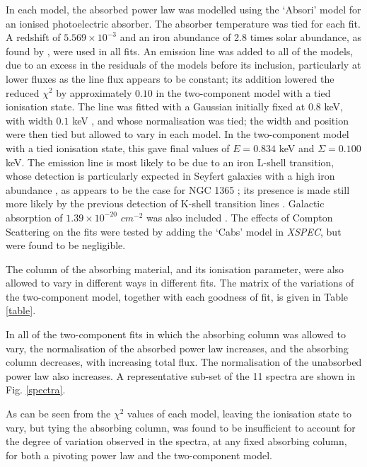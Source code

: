 \documentclass[useAMS,usenatbib]{sam}
\begin{document}
In each model, the absorbed power law was modelled using the `Absori' model for an ionised photoelectric absorber. The absorber temperature was tied for each fit. A
redshift of $5.569 \times 10^{−3}$ \citep{lavaux} and an iron abundance of 2.8 times solar abundance, as found by \citet{risaliti09}, were used in all fits. An emission
line was added to all of the models, due to an excess in the residuals of the models before its inclusion, particularly at lower fluxes as the line flux appears to be
constant; its addition lowered the reduced $\chi^2$ by approximately $0.10$ in the two-component model with a tied ionisation state. The line was fitted with a Gaussian
initially fixed at $0.8$ keV, with width $0.1$ keV , and whose normalisation was tied; the width and position were then tied but allowed to vary in each model. In the
two-component model with a tied ionisation state, this gave final values of $E = 0.834$ keV and $\Sigma = 0.100$ keV. The emission line is most likely to be due to an
iron L-shell transition, whose detection is particularly expected in Seyfert galaxies with a high iron abundance  \citep[e.g.][]{markowitz, fabian09}, as appears
to
be the case for NGC 1365 \citep{risaliti09}; its presence is made still more likely by the previous detection of K-shell transition lines \citep{risaliti05a}. Galactic
absorption of $1.39 \times 10^{−20}$ $cm^{-2}$ was also included \citep{dickey90}. The effects of Compton Scattering on the fits were tested by adding the `Cabs' model in
{\it XSPEC}, but were found to be negligible.

The column of the absorbing material, and its ionisation parameter, were also allowed to vary in different ways in different fits. The matrix of the variations
of the two-component model, together with each goodness of fit, is given in Table \ref{table}.

In all of the two-component fits in which the absorbing column was allowed to vary, the normalisation of the absorbed power law increases, and the absorbing column
decreases, with increasing total flux. The normalisation of the unabsorbed power law also increases. A representative sub-set of the 11 spectra are shown in Fig.
\ref{spectra}.

As can be seen from the $\chi^2$ values of each model, leaving the ionisation state to vary, but tying the absorbing column, was found to be insufficient to account for
the degree of variation observed in the spectra, at any fixed absorbing column, for both a pivoting power law and the two-component model. 
\end{document}
